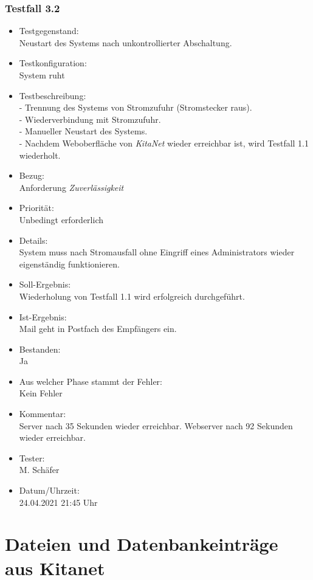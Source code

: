 \subsection{Testfall 3.2}
\begin{itemize}
	\item Testgegenstand:\\
Neustart des Systems nach unkontrollierter Abschaltung.
	\item Testkonfiguration:\\
	System ruht
	\item Testbeschreibung:\\
	- Trennung des Systems von Stromzufuhr (Stromstecker raus).\\
	- Wiederverbindung mit Stromzufuhr.\\
	- Manueller Neustart des Systems.\\
	- Nachdem Weboberfläche von \textit{KitaNet} wieder erreichbar ist, wird Testfall 1.1 wiederholt.
	\item Bezug:\\
	Anforderung \textit{Zuverlässigkeit}
	\item Priorität:\\
	Unbedingt erforderlich
	\item Details:\\
	System muss nach Stromausfall ohne Eingriff eines Administrators wieder eigenständig funktionieren.
	\item Soll-Ergebnis:\\
	Wiederholung von Testfall 1.1 wird erfolgreich durchgeführt.
	\item Ist-Ergebnis:\\
	Mail geht in Postfach des Empfängers ein.
	\item Bestanden:\\
	Ja
	\item Aus welcher Phase stammt der Fehler:\\
	Kein Fehler
	\item Kommentar:\\
	Server nach 35 Sekunden wieder erreichbar.
	Webserver nach 92 Sekunden wieder erreichbar.
	\item Tester:\\
	M. Schäfer
	\item Datum/Uhrzeit:\\
	24.04.2021 21:45 Uhr
\end{itemize}


\chapter{Dateien und Datenbankeinträge aus Kitanet}


